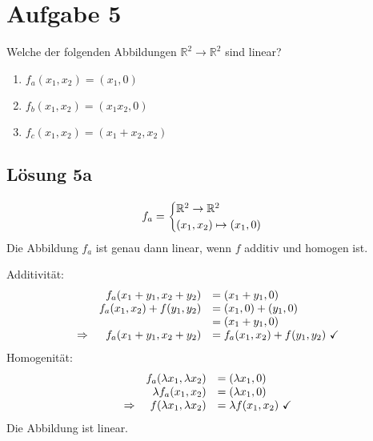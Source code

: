 \documentclass[main.tex]{subfiles}
\begin{document}
\section{Aufgabe 5}
Welche der folgenden Abbildungen $\mathbb{R}^{2}\rightarrow \mathbb{R}^{2}$ sind linear?

\begin{enumerate}
    \item $f_a( x_{1} ,x_{2}) =( x_{1} ,0)$
    \item $f_b( x_{1} ,x_{2}) =( x_{1} x_{2} ,0)$
    \item $f_c( x_{1} ,x_{2}) =( x_{1} +x_{2} ,x_{2})$
\end{enumerate}

\subsection{Lösung 5a}
\begin{equation*}
    \begin{array}{ r l }
    f_a = \begin{cases}
        \mathbb{R}^{2}\to \mathbb{R}^{2} \\
        (x_{1}, x_{2})\mapsto ( x_{1} ,0)
    \end{cases}
    \end{array}
\end{equation*}
Die Abbildung $f_a$ ist genau dann linear, wenn $f$ additiv und homogen ist.

Additivität:
\begin{equation*}
    \begin{array}{ r r l }
    & f_a( x_{1} +y_{1} ,x_{2} +y_{2}) & =( x_{1} +y_{1} ,0)\\
    & f_a( x_{1} ,x_{2}) +f( y_{1} ,y_{2}) & =( x_{1} ,0) +( y_{1} ,0)\\
    &  & =( x_{1} +y_{1} ,0)\\
    \Rightarrow  & f_a( x_{1} +y_{1} ,x_{2} +y_{2}) & =f_a( x_{1} ,x_{2}) +f( y_{1} ,y_{2}) \ \checkmark
    \end{array}
\end{equation*}
Homogenität:
\begin{equation*}
    \begin{array}{ r r l }
    & f_a( \lambda x_{1} ,\lambda x_{2}) & =( \lambda x_{1} ,0)\\
    & \lambda f_a( x_{1} ,x_{2}) & =( \lambda x_{1} ,0)\\
    \Rightarrow  & f( \lambda x_{1} ,\lambda x_{2}) & =\lambda f( x_{1} ,x_{2}) \ \checkmark
    \end{array}
\end{equation*}
Die Abbildung ist linear.
\end{document}
